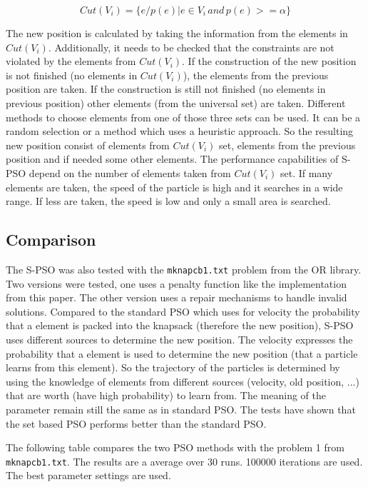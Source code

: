 \documentclass{article}
\begin{document}
\begin{equation}
Cut(V_i) = \{e/p(e)| e \in V_i \, and \, p(e) >= \alpha\}
\end{equation}

The new position is calculated by taking the information from the elements in $Cut(V_i)$. Additionally, it needs to be checked that the constraints are not violated by the elements from $Cut(V_i)$. If the construction of the new position is not finished (no elements in $Cut(V_i)$), the elements from the previous position are taken. If the construction is still not finished (no elements in previous position) other elements (from the universal set) are taken. Different methods to choose elements from one of those three sets can be used. It can be a random selection or a method which uses a heuristic approach. So the resulting new position consist of elements from $Cut(V_i)$ set, elements from the previous position and if needed some other elements. The performance capabilities of S-PSO depend on the number of elements taken from $Cut(V_i)$ set. If many elements are taken, the speed of the particle is high and it searches in a wide range. If less are taken, the speed is low and only a small area is searched.

\subsection{Comparison}
The S-PSO was also tested with the \lstinline$mknapcb1.txt$ problem from the OR library. Two versions were tested, one uses a penalty function like the implementation from this paper. The other version uses a repair mechanisms to handle invalid solutions. Compared to the standard PSO which uses for velocity the probability that a element is packed into the knapsack (therefore the new position), S-PSO uses different sources to determine the new position. The velocity expresses the probability that a element is used to determine the new position (that a particle learns from this element). So the trajectory of the particles is determined by using the knowledge of elements from different sources (velocity, old position, ...) that are worth (have high probability) to learn from. The meaning of the parameter remain still the same as in standard PSO. The tests have shown that the set based PSO performs better than the standard PSO.\\

\newpage

The following table compares the two PSO methods with the problem 1 from \lstinline$mknapcb1.txt$. The results are a average over 30 runs. 100000 iterations are used. The best parameter settings are used.\\
\end{document}
